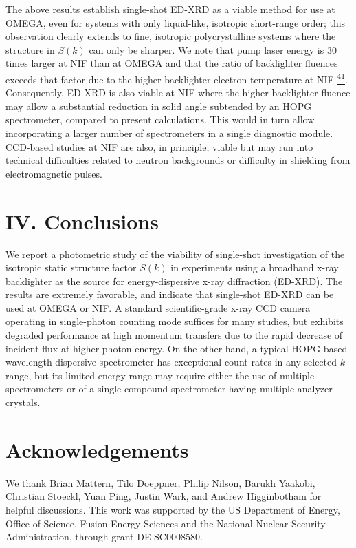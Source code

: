 The above results establish single-shot ED-XRD as a viable method for
use at OMEGA, even for systems with only liquid-like, isotropic
short-range order; this observation clearly extends to fine, isotropic
polycrystalline systems where the structure in \(S(k)\) can only be
sharper. We note that pump laser energy is 30 times larger at NIF than
at OMEGA and that the ratio of backlighter fluences exceeds that factor
due to the higher backlighter electron temperature at NIF
\hyperref[b.-r.-maddox-et-al.-physics-of-plasmas-18-056709-2011.]{\textsuperscript{41}}.
Consequently, ED-XRD is also viable at NIF where the higher backlighter
fluence may allow a substantial reduction in solid angle subtended by an
HOPG spectrometer, compared to present calculations. This would in turn
allow incorporating a larger number of spectrometers in a single
diagnostic module. CCD-based studies at NIF are also, in principle,
viable but may run into technical difficulties related to neutron
backgrounds or difficulty in shielding from electromagnetic pulses.

\FloatBarrier

\section{IV. Conclusions}

We report a photometric study of the viability of single-shot
investigation of the isotropic static structure factor \(S(k)\) in
experiments using a broadband x-ray backlighter as the source for
energy-dispersive x-ray diffraction (ED-XRD). The results are extremely
favorable, and indicate that single-shot ED-XRD can be used at OMEGA or
NIF. A standard scientific-grade x-ray CCD camera operating in
single-photon counting mode suffices for many studies, but exhibits
degraded performance at high momentum transfers due to the rapid
decrease of incident flux at higher photon energy. On the other hand, a
typical HOPG-based wavelength dispersive spectrometer has exceptional
count rates in any selected \(k\) range, but its limited energy range
may require either the use of multiple spectrometers or of a single
compound spectrometer having multiple analyzer crystals.


\section{Acknowledgements} We thank Brian Mattern, Tilo Doeppner, Philip Nilson, Barukh Yaakobi,
Christian Stoeckl, Yuan Ping, Justin Wark, and Andrew Higginbotham for
helpful discussions. This work was supported by the US Department of
Energy, Office of Science, Fusion Energy Sciences and the National
Nuclear Security Administration, through grant DE-SC0008580.

